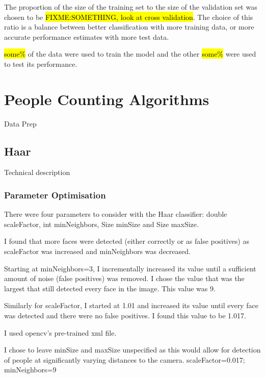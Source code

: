 \documentclass{article}
\begin{document}
The proportion of the size of the training set to the size of the validation set was chosen to be \hl{FIXME:SOMETHING, look at cross validation}. The choice of this ratio is a balance between better classification with more training data, or more accurate performance estimates with more test data.

\hl{some\%} of the data were used to train the model and the other \hl{some\%} were used to test its performance.



\section{People Counting Algorithms}
Data Prep

\subsection{Haar}
Technical description
\subsubsection{Parameter Optimisation}
There were four parameters to consider with the Haar classifier: double scaleFactor, int minNeighbors, Size minSize and Size maxSize.

I found that more faces were detected (either correctly or as false positives) as scaleFactor was increased and minNeighbors was decreased.

Starting at minNeighbors=3, I incrementally increased its value until a sufficient amount of noise (false positives) was removed. I chose the value that was the largest that still detected every face in the image. This value was 9.

Similarly for scaleFactor, I started at 1.01 and increased its value until every face was detected and there were no false positives. I found this value to be 1.017. 

I used opencv's pre-trained xml file.

I chose to leave minSize and maxSize unspecified as this would allow for detection of people at significantly varying distances to the camera.
scaleFactor=0.017; minNeighbors=9
\end{document}
